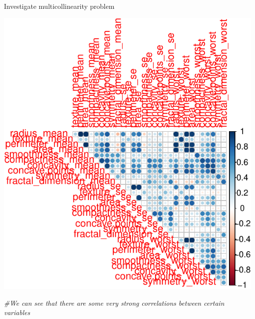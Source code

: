 \documentclass[]{article}
\newenvironment{Shaded}{\begin{snugshade}}{\end{snugshade}}
\newcommand{\CommentTok}[1]{\textcolor[rgb]{0.56,0.35,0.01}{\textit{#1}}}
\newcommand{\DataTypeTok}[1]{\textcolor[rgb]{0.13,0.29,0.53}{#1}}
\newcommand{\KeywordTok}[1]{\textcolor[rgb]{0.13,0.29,0.53}{\textbf{#1}}}
\newcommand{\NormalTok}[1]{#1}
\newcommand{\OperatorTok}[1]{\textcolor[rgb]{0.81,0.36,0.00}{\textbf{#1}}}
\newcommand{\OtherTok}[1]{\textcolor[rgb]{0.56,0.35,0.01}{#1}}
\newcommand{\StringTok}[1]{\textcolor[rgb]{0.31,0.60,0.02}{#1}}
\begin{document}
Investigate multicollinearity problem

\begin{Shaded}
\end{Shaded}

\includegraphics{Logistic-LASSO_files/figure-latex/unnamed-chunk-3-1.pdf}

\begin{Shaded}
\begin{Highlighting}[]
\CommentTok{#We can see that there are some very strong correlations between certain variables}
\end{Highlighting}
\end{Shaded}
\end{document}
